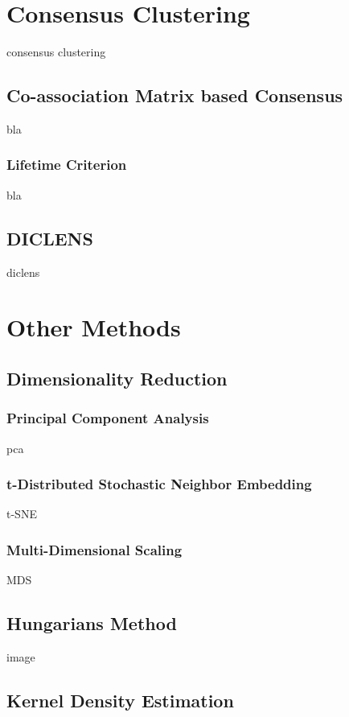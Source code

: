 \documentclass[
	a4paper,
	english,
	twoside,
	openright,               
	11pt                            
	]{report}
\begin{document}
\section{Consensus Clustering}
consensus clustering

\subsection{Co-association Matrix based Consensus}
bla

\subsubsection{Lifetime Criterion}
bla

\subsection{DICLENS}
diclens \cite{DICLENS}

\section{Other Methods}

\subsection{Dimensionality Reduction}\label{sec:dim_reduction}

\subsubsection{Principal Component Analysis}
 pca \cite{pca}

\subsubsection{t-Distributed Stochastic Neighbor Embedding}
 t-SNE \cite{Maaten2008VisualizingDU}

\subsubsection{Multi-Dimensional Scaling}
MDS \cite{mds}

\subsection{Hungarians Method}
image 

\subsection{Kernel Density Estimation}
\end{document}
